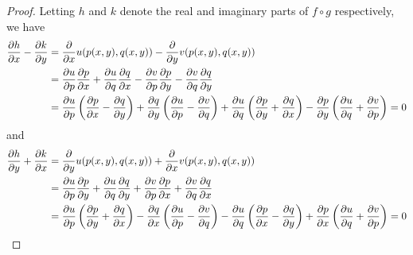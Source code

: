 \documentclass[12pt]{article}
\begin{document}
\begin{proof}
Letting $h$ and $k$ denote the real and imaginary parts of $f \circ g$
respectively, we have
\begin{align*}
 {\partial h \over \partial x} - {\partial k \over \partial y} &=
 {\partial \over \partial x} u(p(x,y),q(x,y)) -
 {\partial \over \partial y} v(p(x,y),q(x,y)) \\ &=
 {\partial u \over \partial p} {\partial p \over \partial x} +
 {\partial u \over \partial q} {\partial q \over \partial x} -
 {\partial v \over \partial p} {\partial p \over \partial y} -
 {\partial v \over \partial q} {\partial q \over \partial y} \\ &=
 {\partial u \over \partial p} \left( {\partial p \over \partial x} -
                                      {\partial q \over \partial y} \right) +
 {\partial q \over \partial y} \left( {\partial u \over \partial p} -
                                      {\partial v \over \partial q} \right) +
 {\partial u \over \partial q} \left( {\partial p \over \partial y} +
                                      {\partial q \over \partial x} \right) -
 {\partial p \over \partial y} \left( {\partial u \over \partial q} +
                                      {\partial v \over \partial p} \right) = 0
\end{align*}
and
\begin{align*}
 {\partial h \over \partial y} + {\partial k \over \partial x} &=
 {\partial \over \partial y} u(p(x,y),q(x,y)) +
 {\partial \over \partial x} v(p(x,y),q(x,y)) \\ &=
 {\partial u \over \partial p} {\partial p \over \partial y} +
 {\partial u \over \partial q} {\partial q \over \partial y} +
 {\partial v \over \partial p} {\partial p \over \partial x} +
 {\partial v \over \partial q} {\partial q \over \partial x} \\ &=
 {\partial u \over \partial p} \left( {\partial p \over \partial y} +
                                      {\partial q \over \partial x} \right) -
 {\partial q \over \partial x} \left( {\partial u \over \partial p} -
                                      {\partial v \over \partial q} \right) -
 {\partial u \over \partial q} \left( {\partial p \over \partial x} -
                                      {\partial q \over \partial y} \right) +
 {\partial p \over \partial x} \left( {\partial u \over \partial q} +
                                      {\partial v \over \partial p} \right) = 0
\end{align*}

\end{proof}
\end{document}

